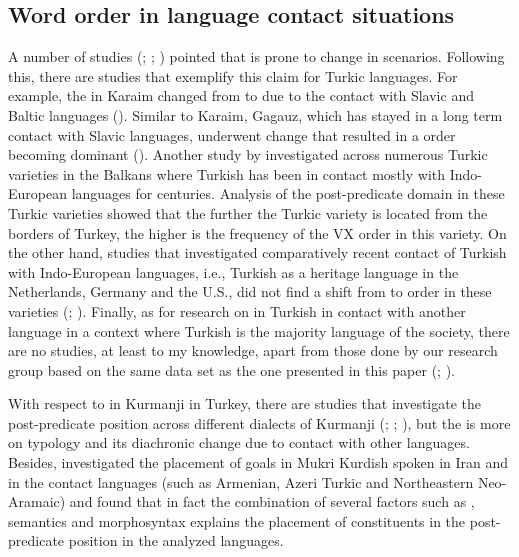 \documentclass[output=paper,colorlinks,citecolor=brown]{langscibook}
\begin{document}
\subsection{Word order in language contact situations}\label{Bilingual:ss:1.2}

A number of studies (\citealt{thomason1988language}; \citealt{thomason2001language}; \citealt{Heine2008contact}) pointed that  is prone to change in  scenarios. Following this, there are studies that exemplify this claim for Turkic languages. For example, the  in Karaim changed from  to  due to the contact with Slavic and Baltic languages (\citealt{csato2002karaim}). Similar to Karaim, Gagauz, which has stayed in a long term contact with Slavic languages, underwent change that resulted in a  order becoming dominant (\citealt{menz1999gagausische}). Another study by \citet{keskin2023directionality} investigated  across numerous Turkic varieties in the Balkans where Turkish has been in contact mostly with Indo-European languages for centuries. Analysis of the post-predicate domain in these Turkic varieties showed that the further the Turkic variety is located from the borders of Turkey, the higher is the frequency of the VX order in this variety. On the other hand, studies that investigated comparatively recent contact of Turkish with Indo-European languages, i.e., Turkish as a heritage language in the Netherlands, Germany and the U.S., did not find a shift from  to  order in these varieties (\citealt{dogruoz2007postverbal}; \citealt{schroeder2023postverbal}). Finally, as for research on  in Turkish in contact with another language in a context where Turkish is the majority language of the society, there are no studies, at least to my knowledge, apart from those done by our research group based on the same data set as the one presented in this paper (\citealt{iefremenko2023postpredicate}; \citealt{iefremenko2023wordorder}). 

With respect to  in Kurmanji in Turkey, there are studies that investigate the post-predicate position across different dialects of Kurmanji (\citealt{haig_verb-goal_2015}; \citealt{haig2018northern}; \citealt{gundogdu2019asymmetries}), but the  is more on  typology and its diachronic change due to contact with other languages. Besides, \citet{asadpour_typologizing_2022} investigated the placement of goals in Mukri Kurdish spoken in Iran and in the contact languages (such as Armenian, Azeri Turkic and Northeastern Neo-Aramaic) and found that in fact the combination of several factors such as , semantics and morphosyntax explains the placement of constituents in the post-predicate position in the analyzed languages. 
\end{document}
